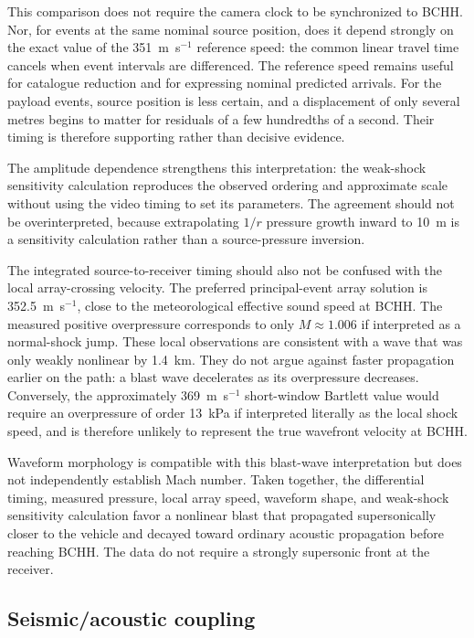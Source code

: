 \documentclass[]{seismica}
\begin{document}
This comparison does not require the camera clock to be synchronized to BCHH.
Nor, for events at the same nominal source position, does it depend strongly on
the exact value of the 351~m~s$^{-1}$ reference speed: the common linear travel
time cancels when event intervals are differenced. The reference speed remains
useful for catalogue reduction and for expressing nominal predicted arrivals.
For the payload events, source position is less certain, and a displacement of
only several metres begins to matter for residuals of a few hundredths of a
second. Their timing is therefore supporting rather than decisive evidence.

The amplitude dependence strengthens this interpretation: the weak-shock
sensitivity calculation reproduces the observed ordering and approximate scale
without using the video timing to set its parameters. The agreement should not
be overinterpreted, because extrapolating $1/r$ pressure growth inward to 10~m
is a sensitivity calculation rather than a source-pressure inversion.

The integrated source-to-receiver timing should also not be confused with the
local array-crossing velocity. The preferred principal-event array solution is
352.5~m~s$^{-1}$, close to the meteorological effective sound speed at BCHH.
The measured positive overpressure corresponds to only $M\approx1.006$ if
interpreted as a normal-shock jump. These local observations are consistent
with a wave that was only weakly nonlinear by 1.4~km. They do not argue against
faster propagation earlier on the path: a blast wave decelerates as its
overpressure decreases. Conversely, the approximately 369~m~s$^{-1}$
short-window Bartlett value would require an overpressure of order 13~kPa if
interpreted literally as the local shock speed, and is therefore unlikely to
represent the true wavefront velocity at BCHH.

Waveform morphology is compatible with this blast-wave interpretation but
does not independently establish Mach number. Taken together, the differential
timing, measured pressure, local array speed, waveform shape, and weak-shock
sensitivity calculation favor a nonlinear blast that propagated supersonically
closer to the vehicle and decayed toward ordinary acoustic propagation before
reaching BCHH. The data do not require a strongly supersonic front at the
receiver.

\subsection{Seismic/acoustic coupling}
\end{document}
